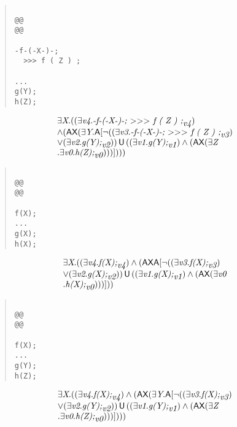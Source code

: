 \documentclass{article}
\newcommand{\U}{\,\mbox{\sf{U}}\,}
\newcommand{\A}{\mbox{\sf{A}}}
\newcommand{\AX}{\mbox{\sf{AX}}}
\newcommand{\mita}[1]{\mbox{\it{{#1}}}}
\newcommand{\mth}[1]{\({#1}\)}
\begin{document}
\begin{quote}\begin{verbatim}

@@
@@

-f-(-X-)-;
  >>> f ( Z ) ;

...
g(Y);
h(Z);
\end{verbatim}\end{quote}

\[\begin{array}{l}
\exists \mita{X} . ((\exists \mita{v4} . \mita{-f-(-X-)-;
  \mth{>}\mth{>}\mth{>} f ( Z ) ;}_{\mita{v4}})\\ \wedge (\AX(\exists \mita{Y} . \A[\neg ((\exists \mita{v3} . \mita{-f-(-X-)-;
  \mth{>}\mth{>}\mth{>} f ( Z ) ;}_{\mita{v3}})\\ \vee (\exists \mita{v2} . \mita{g(Y);}_{\mita{v2}})) \U ((\exists \mita{v1} . \mita{g(Y);}_{\mita{v1}}) \wedge (\AX(\exists \mita{Z}\\ . \exists \mita{v0} . \mita{h(Z);}_{\mita{v0}})))]
)))
\end{array}\]

\begin{quote}\begin{verbatim}

@@
@@

f(X);
...
g(X);
h(X);
\end{verbatim}\end{quote}

\[\begin{array}{l}
\exists \mita{X} . ((\exists \mita{v4} . \mita{f(X);}_{\mita{v4}}) \wedge (\AX\A[\neg ((\exists \mita{v3} . \mita{f(X);}_{\mita{v3}})\\ \vee (\exists \mita{v2} . \mita{g(X);}_{\mita{v2}})) \U ((\exists \mita{v1} . \mita{g(X);}_{\mita{v1}}) \wedge (\AX(\exists \mita{v0}\\ . \mita{h(X);}_{\mita{v0}})))]
))
\end{array}\]

\begin{quote}\begin{verbatim}

@@
@@

f(X);
...
g(Y);
h(Z);
\end{verbatim}\end{quote}

\[\begin{array}{l}
\exists \mita{X} . ((\exists \mita{v4} . \mita{f(X);}_{\mita{v4}}) \wedge (\AX(\exists \mita{Y} . \A[\neg ((\exists \mita{v3} . \mita{f(X);}_{\mita{v3}})\\ \vee (\exists \mita{v2} . \mita{g(Y);}_{\mita{v2}})) \U ((\exists \mita{v1} . \mita{g(Y);}_{\mita{v1}}) \wedge (\AX(\exists \mita{Z}\\ . \exists \mita{v0} . \mita{h(Z);}_{\mita{v0}})))]
)))
\end{array}\]
\end{document}
